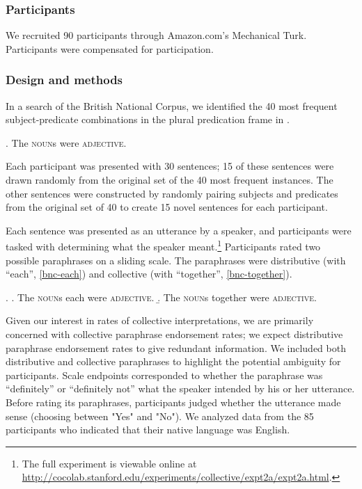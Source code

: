 \documentclass[preprint,12pt,authoryear,titlepage]{elsarticle}
\newcommand{\ndg}[1]{\textcolor{Green}{[ndg: #1]}}
\newcommand{\gcs}[1]{\textcolor{blue}{[gcs: #1]}}
\begin{document}
\subsubsection{Participants}

We recruited 90 participants through Amazon.com's Mechanical Turk. Participants were compensated for participation.

\subsubsection{Design and methods}

In a search of the British National Corpus, we identified the 40 most frequent subject-predicate combinations in the plural predication frame in \Next.

\ex. The \textsc{noun}s were \textsc{adjective}.

Each participant was presented with 30 sentences; 15 of these sentences were drawn randomly 
from the original set of the 40 most frequent instances. The other sentences were constructed by randomly pairing subjects and predicates from the original set of 40 to create 15 novel sentences for each participant. 

Each sentence was presented as an utterance by a speaker, and participants were tasked with determining what the speaker meant.\footnote{The full experiment is viewable online at \url{http://cocolab.stanford.edu/experiments/collective/expt2a/expt2a.html}.} Participants rated two possible paraphrases on a sliding scale. The paraphrases were distributive (with ``each'', \ref{bnc-each}) and collective (with ``together'', \ref{bnc-together}). 

\ex. \a. The \textsc{noun}s each were \textsc{adjective}. \label{bnc-each}
\b. The \textsc{noun}s together were \textsc{adjective}. \label{bnc-together}

Given our interest in rates of collective interpretations, we are primarily concerned with collective paraphrase endorsement rates; we expect distributive paraphrase endorsement rates to give redundant information.  We included both distributive and collective paraphrases to highlight the potential ambiguity for participants.
Scale endpoints corresponded to whether the paraphrase was ``definitely'' or ``definitely not'' what the speaker intended by his or her utterance. Before rating its paraphrases, participants judged whether the utterance made sense (choosing between "Yes" and "No"). We analyzed data from the 85 participants who indicated that their native language was English.
\end{document}
